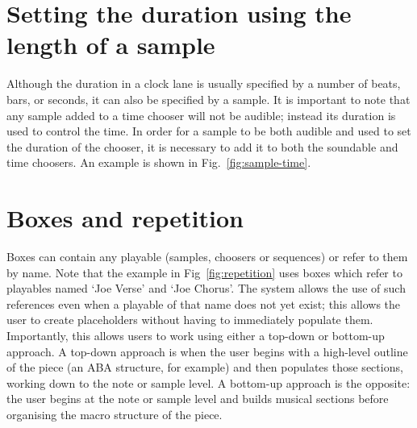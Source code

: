 \documentclass[runningheads,a4paper]{llncs}
\begin{document}
\section{Setting the duration using the length of a
	sample}\label{setting-the-duration-using-the-length-of-a-sample}

Although the duration in a clock lane is usually specified by a number of beats, bars, or seconds, it can also be specified by a sample. It is important to note that any sample added to a time chooser will not be audible; instead its duration is used to control the time. In order for a sample to be both audible and used to set the duration of the chooser,  it is necessary to add it to both the soundable and time choosers. An example is shown in Fig.~\ref{fig:sample-time}.




\section{Boxes and repetition}\label{sec:sequence}


Boxes can contain any playable (samples, choosers or sequences) or refer to them by name. Note that the example in Fig~\ref{fig:repetition} uses boxes which refer to playables named `Joe Verse' and `Joe Chorus'. The system allows the use of such references even when a playable of that name does not yet exist; this allows the user to create placeholders without having to immediately populate them. Importantly, this allows users to work using either a top-down or bottom-up approach. A top-down approach is when the user begins with a high-level outline of the piece (an ABA structure, for example) and then populates those sections, working down to the note or sample level. A bottom-up approach is the opposite: the user begins at the note or sample level and builds musical sections before organising the macro structure of the piece. 
\end{document}

